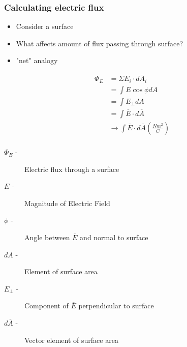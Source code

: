 \subsubsection{Calculating electric flux}%
\label{ssub:calculating_electric_flux}

\begin{itemize}
	\item Consider a surface
	\item What affects amount of flux passing through surface?
	\item "net" analogy
\end{itemize}

\begin{definition}
	\begin{align*}
		\Phi_{E} &= \Sigma \overline{E}_{i}\cdot d \overline{A}_{i} \\
				 &= \int E \cos \phi dA \\
				 &= \int E_{\perp}dA \\
				 &= \int \overline{E} \cdot d\overline{A}\\
				 &\to \int \overline{E} \cdot d \overline{A} \left( \frac{Nm^2}{C} \right) \\
	\end{align*}
	\begin{description}
		\item[$\Phi_{E}$ -] Electric flux through a surface
		\item[$E$ -] Magnitude of Electric Field
		\item[$\phi$ -] Angle between $\overline{E}$ and normal to surface
			\item[$dA$ -] Element of surface area
				\item[$E_{\perp}$ -] Component of $\overline{E}$ perpendicular to surface
					\item[$d\overline{A}$ -] Vector element of surface area
	\end{description}
\end{definition}


\newpage


